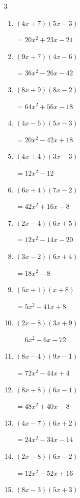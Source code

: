 \begin{multicols}{3}
\begin{enumerate}
        $=9x^{2}-24x-9$

\columnbreak %

  \item $(4x+7)(5x-3)$

        $=20x^{2}+23x-21$

  \item $(9x+7)(4x-6)$

        $=36x^{2}-26x-42$

  \item $(8x+9)(8x-2)$

        $=64x^{2}+56x-18$

  \item $(4x-6)(5x-3)$

        $=20x^{2}-42x+18$

  \item $(4x+4)(3x-3)$

        $=12x^{2}-12$

  \item $(6x+4)(7x-2)$

        $=42x^{2}+16x-8$

  \item $(2x-4)(6x+5)$

        $=12x^{2}-14x-20$

  \item $(3x-2)(6x+4)$

        $=18x^{2}-8$

  \item $(5x+1)(x+8)$

        $=5x^{2}+41x+8$

  \item $(2x-8)(3x+9)$

        $=6x^{2}-6x-72$

  \item $(8x-4)(9x-1)$

        $=72x^{2}-44x+4$

  \item $(8x+8)(6x-1)$

        $=48x^{2}+40x-8$

  \item $(4x-7)(6x+2)$

        $=24x^{2}-34x-14$

  \item $(2x-8)(6x-2)$

        $=12x^{2}-52x+16$

  \item $(8x-3)(5x+3)$


\end{enumerate}
\end{multicols}
